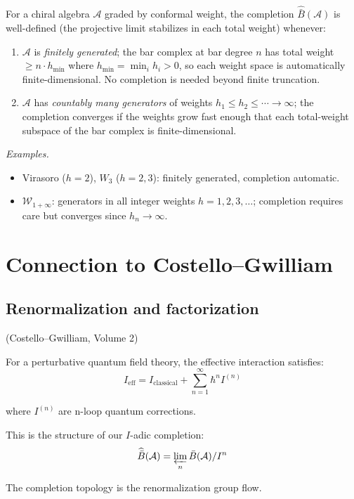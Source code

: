 \begin{proposition}\label{prop:practical-convergence}
For a chiral algebra $\mathcal{A}$ graded by conformal weight, the completion
$\widehat{\bar{B}}(\mathcal{A})$ is well-defined (the projective limit stabilizes
in each total weight) whenever:
\begin{enumerate}
\item $\mathcal{A}$ is \emph{finitely generated}; the bar complex at bar degree $n$
has total weight $\geq n \cdot h_{\min}$ where $h_{\min} = \min_i h_i > 0$,
so each weight space is automatically finite-dimensional.  No completion is needed
beyond finite truncation.
\item $\mathcal{A}$ has \emph{countably many generators} of weights
$h_1 \leq h_2 \leq \cdots \to \infty$; the completion converges if the weights grow
fast enough that each total-weight subspace of the bar complex is finite-dimensional.
\end{enumerate}

\emph{Examples.}
\begin{itemize}
\item Virasoro ($h = 2$), $W_3$ ($h = 2, 3$): finitely generated, completion automatic.
\item $\mathcal{W}_{1+\infty}$: generators in all integer weights $h = 1, 2, 3, \ldots$;
completion requires care but converges since $h_n \to \infty$.
\end{itemize}
\end{proposition}

\section{Connection to Costello--Gwilliam}

\subsection{Renormalization and factorization}

\begin{theorem}\label{thm:CG-renorm}
\textup{(Costello--Gwilliam, Volume 2)}

For a perturbative quantum field theory, the effective interaction satisfies:
\[I_{\text{eff}} = I_{\text{classical}} + \sum_{n=1}^{\infty} \hbar^n I^{(n)}\]

where $I^{(n)}$ are n-loop quantum corrections.

This is the structure of our $I$-adic completion:
\[\widehat{\bar{B}}(\mathcal{A}) = \varprojlim_{n} \bar{B}(\mathcal{A})/I^n\]

The completion topology is the renormalization group flow.
\end{theorem}

